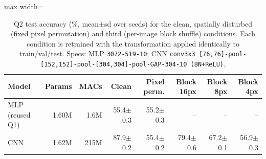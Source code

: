 \begin{table}[t]
\centering
\footnotesize
\setlength{\tabcolsep}{3.5pt}
\begin{adjustbox}{max width=\linewidth}
\begin{tabular}{lrrrrrrr}
\toprule
Model & Params & MACs & Clean & Pixel perm. & Block 16px & Block 8px & Block 4px \\
\midrule
MLP (reused Q1) & 1.60M & 1.6M & 55.4$\pm$0.3 & 55.2$\pm$0.3 & -- & -- & -- \\
CNN & 1.62M & 215M & 87.9$\pm$0.2 & 55.4$\pm$0.2 & 79.4$\pm$0.6 & 67.2$\pm$0.1 & 56.9$\pm$0.3 \\
\bottomrule
\end{tabular}
\end{adjustbox}
\caption{Q2 test accuracy (\%, mean$\pm$sd over seeds) for the clean, spatially disturbed (fixed pixel permutation) and third (per-image block shuffle) conditions. Each condition is retrained with the transformation applied identically to train/val/test. Specs: MLP \texttt{3072-519-10}; CNN \texttt{conv3x3 [76,76]-pool-[152,152]-pool-[304,304]-pool-GAP-304-10 (BN+ReLU)}.}
\label{tab:q2}
\end{table}
